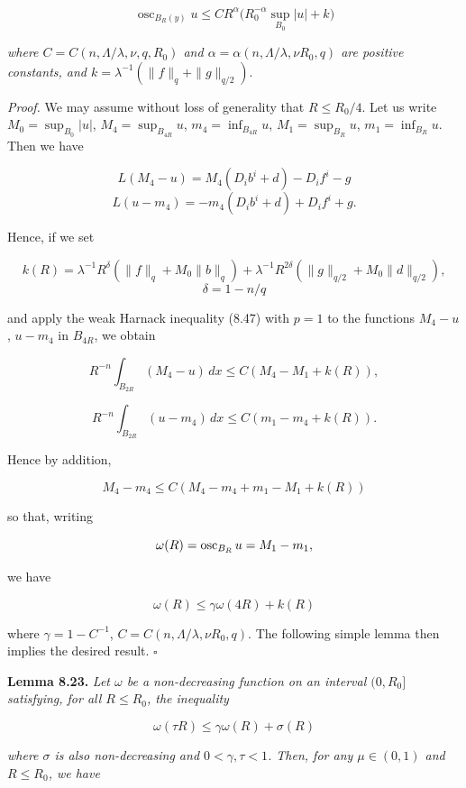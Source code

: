 \[
\tag{8.65}
\operatorname{osc}_{B_{R}(y)} u \le C R^{\alpha}\bigl(R_0^{-\alpha}\sup_{B_0}|u| + k\bigr)
\]

\noindent \emph{where $C = C(n,\Lambda/\lambda,\nu,q,R_0)$ and $\alpha = \alpha(n,\Lambda/\lambda,\nu R_0,q)$ are positive constants, and
$k = \lambda^{-1}(\|f\|_q + \|g\|_{q/2}).$}

\medskip

\noindent\emph{Proof.} We may assume without loss of generality that $R \le R_0/4$. Let us write
$M_0 = \sup_{B_0}|u|$, $M_4 = \sup_{B_{4R}} u$, $m_4 = \inf_{B_{4R}} u$, $M_1 = \sup_{B_R} u$, $m_1 = \inf_{B_R} u$. Then we have

\[
L(M_4-u)= M_4(D_i b^i + d)-D_i f^i-g
\]
\[
L(u-m_4)= -m_4(D_i b^i + d)+D_i f^i+g.
\]

\noindent Hence, if we set

\[
k(R)= \lambda^{-1}R^{\delta}(\|f\|_q+M_0\|b\|_q)+\lambda^{-1}R^{2\delta}(\|g\|_{q/2}+M_0\|d\|_{q/2}),
\]
\[
\delta = 1-n/q
\]

\noindent and apply the weak Harnack inequality (8.47) with $p=1$ to the functions $M_4-u$,
$u-m_4$ in $B_{4R}$, we obtain

\[
R^{-n}\int_{B_{2R}} (M_4-u)\,dx \le C(M_4-M_1+k(R)),
\]

\[
R^{-n}\int_{B_{2R}} (u-m_4)\,dx \le C(m_1-m_4+k(R)).
\]

\noindent Hence by addition,

\[
M_4-m_4 \le C(M_4-m_4+m_1-M_1+k(R))
\]


so that, writing

\[
\omega(R)=\operatorname{osc}_{B_R} u=M_1-m_1,
\]

we have

\[
\omega(R)\le \gamma\omega(4R)+k(R)
\]

where $\gamma=1-C^{-1}$, $C=C(n,\Lambda/\lambda,\nu R_0,q)$. The following simple lemma then implies the desired result. $\square$

\medskip

\noindent\textbf{Lemma 8.23.} \textit{Let $\omega$ be a non-decreasing function on an interval $(0,R_0]$ satisfying, for all $R\le R_0$, the inequality}

\begin{equation}
\omega(\tau R)\le \gamma\omega(R)+\sigma(R)
\tag{8.66}
\end{equation}

\textit{where $\sigma$ is also non-decreasing and $0<\gamma,\tau<1$. Then, for any $\mu\in(0,1)$ and $R\le R_0$, we have}

